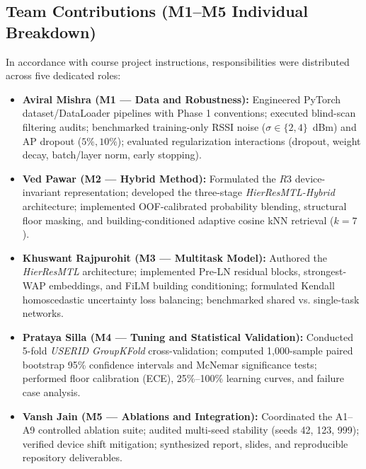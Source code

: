 \documentclass[conference]{IEEEtran}
\begin{document}
\subsection{Team Contributions (M1--M5 Individual Breakdown)}
In accordance with course project instructions, responsibilities were distributed across five dedicated roles:
\begin{itemize}
    \item \textbf{Aviral Mishra (M1 --- Data and Robustness):} Engineered PyTorch dataset/DataLoader pipelines with Phase 1 conventions; executed blind-scan filtering audits; benchmarked training-only RSSI noise ($\sigma \in \{2, 4\}$~dBm) and AP dropout ($5\%, 10\%$); evaluated regularization interactions (dropout, weight decay, batch/layer norm, early stopping).
    \item \textbf{Ved Pawar (M2 --- Hybrid Method):} Formulated the $R3$ device-invariant representation; developed the three-stage \textit{HierResMTL-Hybrid} architecture; implemented OOF-calibrated probability blending, structural floor masking, and building-conditioned adaptive cosine kNN retrieval ($k=7$).
    \item \textbf{Khuswant Rajpurohit (M3 --- Multitask Model):} Authored the \textit{HierResMTL} architecture; implemented Pre-LN residual blocks, strongest-WAP embeddings, and FiLM building conditioning; formulated Kendall homoscedastic uncertainty loss balancing; benchmarked shared vs. single-task networks.
    \item \textbf{Prataya Silla (M4 --- Tuning and Statistical Validation):} Conducted 5-fold \textit{USERID GroupKFold} cross-validation; computed 1,000-sample paired bootstrap 95\% confidence intervals and McNemar significance tests; performed floor calibration (ECE), 25\%--100\% learning curves, and failure case analysis.
    \item \textbf{Vansh Jain (M5 --- Ablations and Integration):} Coordinated the A1--A9 controlled ablation suite; audited multi-seed stability (seeds 42, 123, 999); verified device shift mitigation; synthesized report, slides, and reproducible repository deliverables.
\end{itemize}
\end{document}
